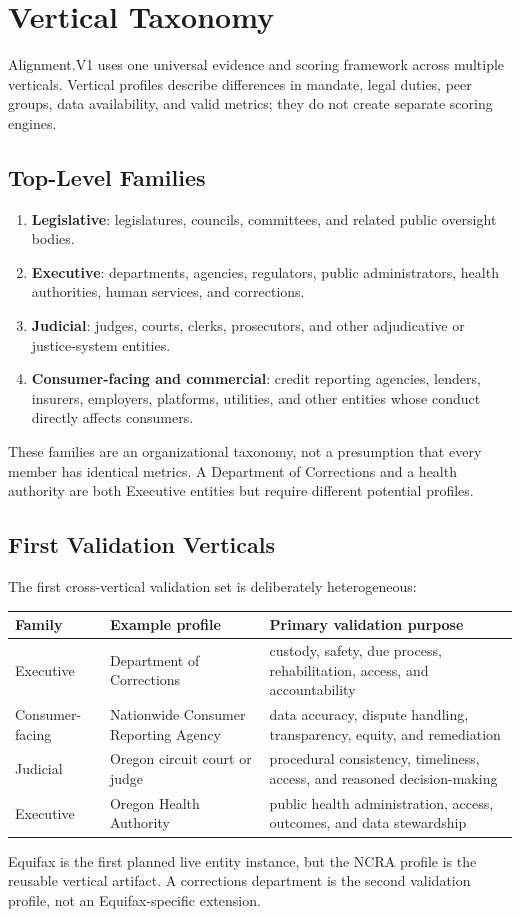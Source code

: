 \section{Vertical Taxonomy}

Alignment.V1 uses one universal evidence and scoring framework across multiple
verticals. Vertical profiles describe differences in mandate, legal duties,
peer groups, data availability, and valid metrics; they do not create separate
scoring engines.

\subsection{Top-Level Families}

\begin{enumerate}
  \item \textbf{Legislative}: legislatures, councils, committees, and related
        public oversight bodies.
  \item \textbf{Executive}: departments, agencies, regulators, public
        administrators, health authorities, human services, and corrections.
  \item \textbf{Judicial}: judges, courts, clerks, prosecutors, and other
        adjudicative or justice-system entities.
  \item \textbf{Consumer-facing and commercial}: credit reporting agencies,
        lenders, insurers, employers, platforms, utilities, and other entities
        whose conduct directly affects consumers.
\end{enumerate}

These families are an organizational taxonomy, not a presumption that every
member has identical metrics. A Department of Corrections and a health
authority are both Executive entities but require different potential
profiles.

\subsection{First Validation Verticals}

The first cross-vertical validation set is deliberately heterogeneous:

\begin{center}
\begin{tabular}{p{4cm}p{5cm}p{5cm}}
\toprule
Family & Example profile & Primary validation purpose \\
\midrule
Executive & Department of Corrections & custody, safety, due process, rehabilitation, access, and accountability \\
Consumer-facing & Nationwide Consumer Reporting Agency & data accuracy, dispute handling, transparency, equity, and remediation \\
Judicial & Oregon circuit court or judge & procedural consistency, timeliness, access, and reasoned decision-making \\
Executive & Oregon Health Authority & public health administration, access, outcomes, and data stewardship \\
\bottomrule
\end{tabular}
\end{center}

Equifax is the first planned live entity instance, but the NCRA profile is the
reusable vertical artifact. A corrections department is the second validation
profile, not an Equifax-specific extension.
